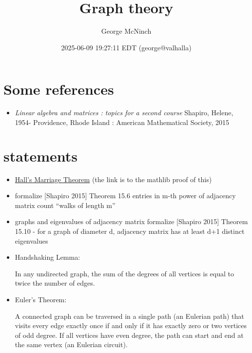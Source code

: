 \documentclass[11pt]{article}
\author{George McNinch}
\date{2025-06-09 19:27:11 EDT (george@valhalla)}
\title{Graph theory}
\numberwithin{equation}{section}
\numberwithin{equation}{section}
\begin{document}
\maketitle
\section{Some references}
\label{sec:org6b05c5f}

\begin{itemize}
\item \emph{Linear algebra and matrices : topics for a second course}
Shapiro, Helene, 1954-
Providence, Rhode Island : American Mathematical Society, 2015
\end{itemize}
\section{statements}
\label{sec:statements}
\begin{itemize}
\item \href{https://leanprover-community.github.io/mathlib4\_docs/Mathlib/Combinatorics/Hall/Finite.html}{Hall's Marriage Theorem} (the link is to the mathlib proof of this)

\item formalize [Shapiro 2015] Theorem 15.6
entries in m-th power of adjacency matrix count ``walks of length m''

\item graphs and eigenvalues of adjacency matrix formalize [Shapiro 2015]
Theorem 15.10 - for a graph of diameter d, adjacency matrix has at
least d+1 distinct eigenvalues

\item Handshaking Lemma:

In any undirected graph, the sum of the degrees of all vertices is
equal to twice the number of edges.

\item Euler's Theorem:

A connected graph can be traversed in a single path (an Eulerian
path) that visits every edge exactly once if and only if it has
exactly zero or two vertices of odd degree. If all vertices have
even degree, the path can start and end at the same vertex (an
Eulerian circuit).
\end{itemize}
\end{document}
